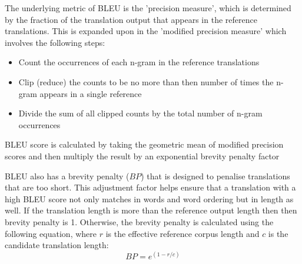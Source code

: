 
The underlying metric of \acrshort{BLEU} is the 'precision measure', which is determined by the fraction of the translation output that appears in the reference translations. This is expanded upon in the 'modified precision measure' which involves the following steps:
\begin{itemize}
    \item Count the occurrences of each n-gram in the reference translations
    \item Clip (reduce) the counts to be no more than then number of times the n-gram appears in a single reference
    \item Divide the sum of all clipped counts by the total number of n-gram occurrences
\end{itemize}

\acrshort{BLEU} score is calculated by taking the geometric mean of modified precision scores and then multiply the result by an exponential brevity penalty factor

\acrshort{BLEU} also has a brevity penalty ($BP$) that is designed to penalise translations that are too short. This adjustment factor helps ensure that a translation with a high \acrshort{BLEU} score not only matches in words and word ordering but in length as well.
If the translation length is more than the reference output length then then brevity penalty is 1. Otherwise, the brevity penalty is calculated using the following equation, where $r$ is the effective reference corpus length and $c$ is the candidate translation length:
\begin{equation}
    BP = e^{(1-r/c)}
\end{equation}


